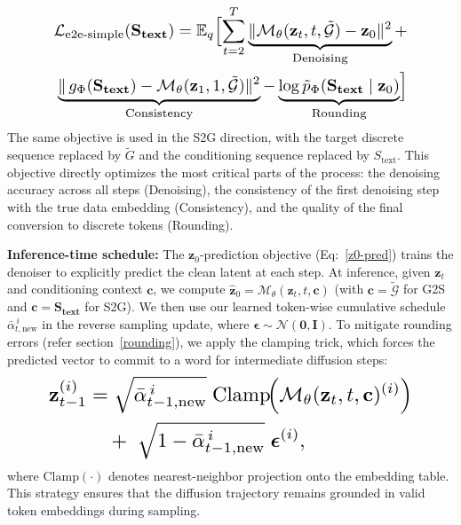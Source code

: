 \begin{equation}
\label{z0-pred}
\resizebox{0.85\columnwidth}{!}{
$
\begin{aligned}
\mathcal{L}_{\text{e2e-simple}}(\mathbf{S_{text}}) = \mathbb{E}_{q} 
    \Bigl[ \sum_{t=2}^{T} \underbrace{\|\mathcal{M}_\theta(\mathbf{z}_t, t, \tilde{\mathcal{G}}) - \mathbf{z}_0 \|^2}_{\text{Denoising}} + \\\underbrace{\|\,g_\Phi(\mathbf{S_{text}}) - \mathcal{M}_\theta(\mathbf{z}_1, 1, \tilde{\mathcal{G}})\|^2}_{\text{Consistency}} - \underbrace{\log \tilde{p}_\Phi(\mathbf{S_{text}} \mid \mathbf{z}_0)}_{\text{Rounding}} \Bigr]
\end{aligned}
$
}
\end{equation}
The same objective is used in the S2G direction, with the target discrete sequence replaced by \(\tilde{G}\) and the conditioning sequence replaced by \(S_{\text{text}}\).
This objective directly optimizes the most critical parts of the process: the denoising accuracy across all steps (Denoising), the consistency of the first denoising step with the true data embedding (Consistency), and the quality of the final conversion to discrete tokens (Rounding)\label{rounding}. 

\noindent \textbf{Inference-time schedule:}
The $\mathbf{z}_0$-prediction objective (Eq:~\ref{z0-pred}) trains the denoiser to explicitly predict the clean latent at each step.
At inference, given $\mathbf{z}_t$ and conditioning context $\mathbf{c}$, we compute
$\hat{\mathbf{z}}_0 = \mathcal{M}_\theta(\mathbf{z}_t, t, \mathbf{c})$
(with $\mathbf{c}=\tilde{\mathcal{G}}$ for G2S and $\mathbf{c}=\mathbf{S_{text}}$ for S2G).
We then use our learned token-wise cumulative schedule $\bar{\alpha}^{\,i}_{t,\mathrm{new}}$ in the reverse sampling update, where $\boldsymbol{\epsilon}\sim\mathcal{N}(\mathbf{0},\mathbf{I})$.
To mitigate rounding errors (refer section~\ref{rounding}), we apply the clamping trick, which forces the predicted vector to commit to a word for intermediate diffusion steps:
\begin{equation}
\label{eq:inference_schedule}
\resizebox{0.85\columnwidth}{!}{$
\begin{aligned}
\mathbf{z}^{(i)}_{t-1}
&=
\sqrt{\bar{\alpha}^{\,i}_{t-1,\mathrm{new}}}\;\mathrm{Clamp}\!\Big(\mathcal{M}_\theta(\mathbf{z}_t, t, \mathbf{c})^{(i)}\Big) \\
&\quad+\;
\sqrt{1-\bar{\alpha}^{\,i}_{t-1,\mathrm{new}}}\;\boldsymbol{\epsilon}^{(i)},
\end{aligned}
$}
\end{equation}
\noindent where $\mathrm{Clamp}(\cdot)$ denotes nearest-neighbor projection onto the embedding table.
This strategy ensures that the diffusion trajectory remains grounded in valid token embeddings during sampling.

